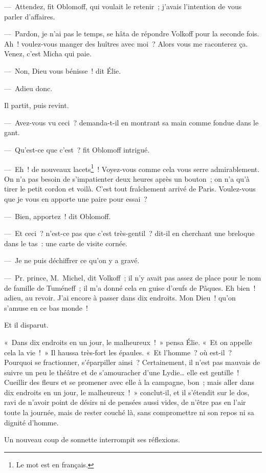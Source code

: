 \documentclass[french,twoside]{book} %
\begin{document}
— Attendez, fit Oblomoff, qui voulait le retenir ; j’avais l’intention de vous parler d’affaires.\par
— Pardon, je n’ai pas le temps, se hâta de répondre Volkoff pour la seconde fois. Ah ! voulez-vous manger des huîtres avec moi ? Alors vous me raconterez ça. Venez, c’est Micha qui paie.\par
— Non, Dieu vous bénisse ! dit Élie.\par
— Adieu donc.\par
Il partit, puis revint.\par
— Avez-vous vu ceci ? demanda-t-il en montrant sa main comme fondue dans le gant.\par
— Qu’est-ce que c’est ? fit Oblomoff intrigué.\par
— Eh ! de nouveaux lacets\footnote{Le mot est en français.} ! Voyez-vous comme cela vous serre admirablement. On n’a pas besoin de s’impatienter deux heures après un bouton ; on n’a qu’à tirer le petit cordon et voilà. C’est tout fraîchement arrivé de Paris. Voulez-vous que je vous en apporte une paire pour essai ?\par
— Bien, apportez ! dit Oblomoff.\par
— Et ceci ? n’est-ce pas que c’est très-gentil ? dit-il en cherchant une breloque dans le tas : une carte de visite cornée.\par
— Je ne puis déchiffrer ce qu’on y a gravé.\par
— Pr. prince, M. Michel, dit Volkoff ; il n’y avait pas assez de place pour le nom de famille de Tuméneff ; il m’a donné cela en guise d’œufs de Pâques. Eh bien ! adieu, au revoir. J’ai encore à passer dans dix endroits. Mon Dieu ! qu’on s’amuse en ce bas monde !\par
Et il disparut.\par
« Dans dix endroits en un jour, le malheureux ! » pensa Élie. « Et on appelle cela la vie ! » Il haussa très-fort les épaules. « Et l’homme ? où est-il ? Pourquoi se fractionner, s’éparpiller ainsi ? Certainement, il n’est pas mauvais de suivre un peu le théâtre et de s’amouracher d’une Lydie… elle est gentille ! Cueillir des fleurs et se promener avec elle à la campagne, bon ; mais aller dans dix endroits en un jour, le malheureux ! » conclut-il, et il s’étendit sur le dos, ravi de n’avoir point de désirs ni de pensées aussi vides, de n’être pas en l’air toute la journée, mais de rester couché là, sans compromettre ni son repos ni sa dignité d’homme.\par
Un nouveau coup de sonnette interrompit ses réflexions.\par
\end{document}
